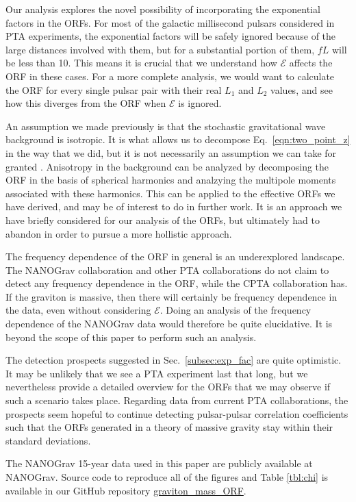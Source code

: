 \documentclass[prd,aps,psfig,nofootinbib,nobibnotes,superscriptaddress,preprintnumbers,times]{revtex4-2}\setlength{\topmargin}{-14mm}
\begin{document}
Our analysis explores the novel possibility of incorporating the exponential factors in the ORFs. For most of the galactic millisecond pulsars considered in PTA experiments, the exponential factors will be safely ignored because of the large distances involved with them, but for a substantial portion of them, $fL$ will be less than 10. This means it is crucial that we understand how $\mathcal{E}$ affects the ORF in these cases. For a more complete analysis, we would want to calculate the ORF for every single pulsar pair with their real $L_1$ and $L_2$ values, and see how this diverges from the ORF when $\mathcal{E}$ is ignored.

An assumption we made previously is that the stochastic gravitational wave background is isotropic. It is what allows us to decompose Eq.\ \ref{eqn:two_point_z} in the way that we did, but it is not necessarily an assumption we can take for granted \cite{Depta:2024ykq, Bravo:2025csu, Cusin:2025xle, Kuwahara:2024jiz, Li:2024lvt}. Anisotropy in the background can be analyzed by decomposing the ORF in the basis of spherical harmonics and analzying the multipole moments associated with these harmonics. This can be applied to the effective ORFs we have derived, and may be of interest to do in further work. It is an approach we have briefly considered for our analysis of the ORFs, but ultimately had to abandon in order to pursue a more hollistic approach.

The frequency dependence of the ORF in general is an underexplored landscape. The NANOGrav collaboration and other PTA collaborations do not claim to detect any frequency dependence in the ORF, while the CPTA collaboration has. If the graviton is massive, then there will certainly be frequency dependence in the data, even without considering $\mathcal{E}$. Doing an analysis of the frequency dependence of the NANOGrav data would therefore be quite elucidative. It is beyond the scope of this paper to perform such an analysis.

The detection prospects suggested in Sec.\ \ref{subsec:exp_fac} are quite optimistic. It may be unlikely that we see a PTA experiment last that long, but we nevertheless provide a detailed overview for the ORFs that we may observe if such a scenario takes place. Regarding data from current PTA collaborations, the prospects seem hopeful to continue detecting pulsar-pulsar correlation coefficients such that the ORFs generated in a theory of massive gravity stay within their standard deviations. 

\vspace{3mm}
The NANOGrav 15-year data used in this paper are publicly available at NANOGrav. Source code to reproduce all of the figures and Table \ref{tbl:chi} is available in our GitHub repository \href{https://github.com/ChrisChoi314/graviton_mass_ORF}{graviton\_mass\_ORF}.
\end{document}
